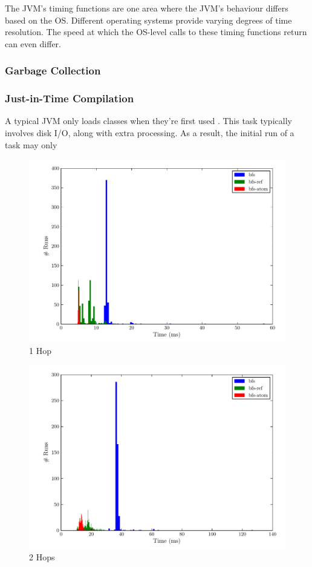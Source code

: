 \documentclass[12pt,letterpaper,oneside]{report}
\theoremstyle{definition}
\begin{document}
					The JVM's timing functions are one area where the JVM's behaviour differs based on the OS.  Different operating systems provide varying degrees of time resolution.  The speed at which the OS-level calls to these timing functions return can even differ.
				
				\subsubsection{Garbage Collection}
			
				\subsubsection{Just-in-Time Compilation}
					A typical JVM only loads classes when they're first used \cite{rob-java-bench-08}.  This task typically involves disk I/O, along with extra processing.  As a result, the initial run of a task may only 
				
		
		\begin{figure}[!ht]
			\centering
			\includegraphics[scale=0.85]{1_hops}
			\caption{1 Hop}
			\label{fig:perf-1-hop}
		\end{figure}
		
		\begin{figure}[!ht]
			\centering
			\includegraphics[scale=0.85]{2_hops}
			\caption{2 Hops}
			\label{fig:perf-2-hops}
		\end{figure}
		
\end{document}
